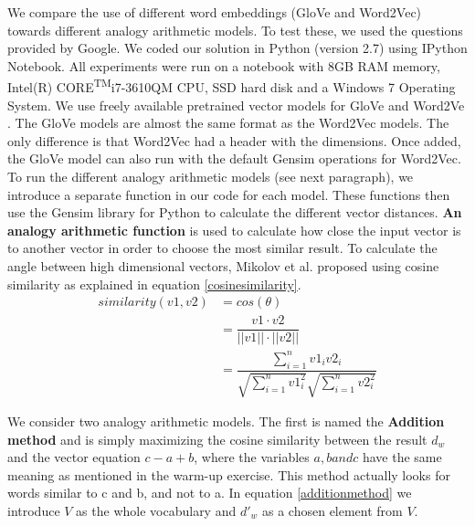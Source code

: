 We compare the use of different word embeddings (GloVe and Word2Vec) towards different analogy arithmetic models\cite{marekreiblog}. To test these, we used the questions provided by Google\cite{word2vecquestionwords}.
\newline
\newline
We coded our solution in Python (version 2.7) using IPython Notebook. All experiments were run on a notebook with 8GB RAM memory, Intel(R) CORE\textsuperscript{TM}i7-3610QM CPU, SSD hard disk and a Windows 7 Operating System.
\newline
\newline
We use freely available pretrained vector models for GloVe \cite{glovedata} and Word2Ve \cite{word2vecdata}. The GloVe models are almost the same format as the Word2Vec models. The only difference is that Word2Vec had a header with the dimensions. Once added, the GloVe model can also run with the default Gensim operations for Word2Vec.
\newline
\newline
To run the different analogy arithmetic models (see next paragraph), we introduce a separate function in our code for each model. These functions then use the Gensim library for Python \cite{gensim} to calculate the different vector distances.
\newline
\newline
\textbf{An analogy arithmetic function} is used to calculate how close the input vector is to another vector in order to choose the most similar result. To calculate the angle between high dimensional vectors, Mikolov et al. \cite{mikolov} proposed using cosine similarity as explained in equation \ref{cosinesimilarity}. 
\begin{equation}
\begin{split}
\label{cosinesimilarity}
similarity(v1, v2) &= cos(\theta) \\&= \dfrac{v1 \cdot v2}{||v1|| \cdot ||v2||}  \\&= \dfrac{\sum_{i=1}^{n}v1_i v2_i}{\sqrt{\sum_{i=1}^{n}v1_i^2} \sqrt{\sum_{i=1}^{n} v2_i^2}}
\end{split}
\end{equation}

\leavevmode
\newline
We consider two analogy arithmetic models. The first is named the \textbf{Addition method} and is simply maximizing the cosine similarity between the result $d_w$ and the vector equation $c-a+b$, where the variables $a, b and c$ have the same meaning as mentioned in the warm-up exercise. This method actually looks for words similar to c and b, and not to a. In equation \ref{additionmethod} we introduce $V$ as the whole vocabulary and $d'_w$ as a chosen element from $V$.

